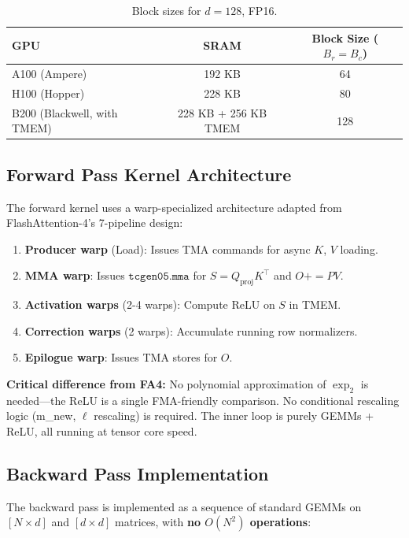 \documentclass[11pt,a4paper]{article}
\theoremstyle{remark}
\begin{document}
\begin{table}[h]
\centering
\caption{Block sizes for $d=128$, FP16.}
\begin{tabular}{lcc}
\toprule
\textbf{GPU} & \textbf{SRAM} & \textbf{Block Size ($B_r = B_c$)} \\
\midrule
A100 (Ampere) & 192 KB & 64 \\
H100 (Hopper) & 228 KB & 80 \\
B200 (Blackwell, with TMEM) & 228 KB + 256 KB TMEM & 128 \\
\bottomrule
\end{tabular}
\end{table}

\subsection{Forward Pass Kernel Architecture}

The forward kernel uses a warp-specialized architecture adapted from FlashAttention-4's 7-pipeline design:

\begin{enumerate}[leftmargin=*]
    \item \textbf{Producer warp} (Load): Issues TMA commands for async $K$, $V$ loading.
    \item \textbf{MMA warp}: Issues $\texttt{tcgen05.mma}$ for $S = Q_{\text{proj}} K^\top$ and $O += P V$.
    \item \textbf{Activation warps} (2-4 warps): Compute ReLU on $S$ in TMEM.
    \item \textbf{Correction warps} (2 warps): Accumulate running row normalizers.
    \item \textbf{Epilogue warp}: Issues TMA stores for $O$.
\end{enumerate}

\textbf{Critical difference from FA4:} No polynomial approximation of $\exp_2$ is needed---the ReLU is a single FMA-friendly comparison. No conditional rescaling logic (m\_new, $\ell$ rescaling) is required. The inner loop is purely GEMMs + ReLU, all running at tensor core speed.

\subsection{Backward Pass Implementation}

The backward pass is implemented as a sequence of standard GEMMs on $[N \times d]$ and $[d \times d]$ matrices, with \textbf{no $O(N^2)$ operations}:
\end{document}
